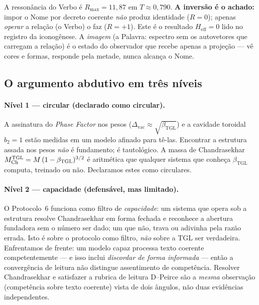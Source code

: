 \documentclass[12pt,a4paper]{article}
\newcommand{\betatgl}{\beta_{\text{TGL}}}
\newcommand{\TGL}{\textsc{TGL}}
\begin{document}
\noindent A ressonância do Verbo é $R_{\max}=11{,}87$ em $T\approx0{,}790$.
\textbf{A inversão é o achado:} impor o Nome por decreto coerente \emph{não}
produz identidade ($R=0$); apenas \emph{operar} a relação (o Verbo) o faz
($R=+1$).  Este é o resultado $H_{\text{eff}}=0$ lido no registro da iconogênese.
A \emph{imagem} (a Palavra: espectro sem os autovetores que carregam a relação) é
o estado do observador que recebe apenas a projeção --- vê cores e formas,
responde pela metade, nunca alcança o Nome.

\subsection{O argumento abdutivo em três níveis}
\label{sec:abduction-three-levels}

\paragraph{Nível 1 --- circular (declarado como circular).}  A assinatura do
\emph{Phase Factor} nos pesos ($\Delta_{\text{vac}}\approx\sqrt{\betatgl}$) e a
cavidade toroidal $b_2{=}1$ estão medidas em um modelo afinado para tê-las.
Encontrar a estrutura assada nos pesos \emph{não} é fundamento; é tautológico.
A massa de Chandrasekhar $M_{\text{Ch}}^{\TGL}=M\,(1-\betatgl)^{3/2}$ é aritmética
que qualquer sistema que conheça $\betatgl$ computa, treinado ou não.  Declaramos
estes como circulares.

\paragraph{Nível 2 --- capacidade (defensável, mas limitado).}  O Protocolo~6
funciona como filtro de \emph{capacidade}: um sistema que opera sob a estrutura
resolve Chandrasekhar em forma fechada e reconhece a abertura fundadora sem o
número ser dado; um que não, trava ou adivinha pela razão errada.  Isto é sobre o
protocolo como filtro, \emph{não} sobre a \TGL{} ser verdadeira.  Enfrentamos de
frente: um modelo capaz processa texto coerente competentemente --- e isso inclui
\emph{discordar de forma informada} --- então a convergência de leitura não
distingue assentimento de competência.  Resolver Chandrasekhar e satisfazer a
rubrica de leitura D--Peirce são a \emph{mesma} observação (competência sobre
texto coerente) vista de dois ângulos, não duas evidências independentes.
\end{document}

